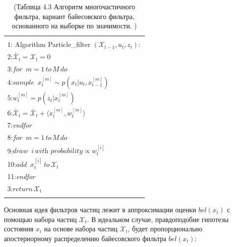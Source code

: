 \documentclass[10pt,a4paper]{article}
\begin{document}
\begin{table}[H]
\begin{center}
\begin{tabular}{|l|}
\hline
{}\\
1: \hspace{3mm} Algorithm Particle\_filter $(\mathcal X_{t-1},u_t,z_t):$ \\
2:\hspace{7mm}$\bar{\mathcal X}_t=\mathcal X_t=0$\\
3:\hspace{7mm}$\textit{for }\, m=1\, \textit{to}\, M\,\textit{do}$\\
4:\hspace{12mm}$\textit{sample }\,x_t^{[m]}\sim p(x_t|u_t,x_{t-1}^{[m]})$\\
5:\hspace{12mm}$w_t^{[m]}=p(z_t|x_t^{[m]})$\\
6:\hspace{12mm}$\bar{\mathcal X}_t=\bar{\mathcal X}_t+\langle x_t^{[m]},w_t^{[m]}\rangle$\\
7:\hspace{7mm}\textit{endfor}\\
8:\hspace{7mm}$\textit{for }\, m=1\, \textit{to}\, M\,\textit{do}$\\
9:\hspace{12mm}$\textit{draw } \,i\, \textit{with probability} \propto w_t^{[i]}$\\
10:\hspace{12mm}$\textit{add }\, x_t^{[i]}\, \textit{to}\, \mathcal X_t$\\
11:\hspace{7mm}\textit{endfor}\\
3:\hspace{7mm}$\textit{return}\, \mathcal X_t$\\
{}\\
\hline
\end{tabular}
\caption{(Таблица 4.3 Алгоритм многочастичного фильтра, вариант байесовского фильтра, основанного на выборке по значимости. )}
\end{center}
\end{table}
Основная идея фильтров частиц лежит в аппроксимации оценки $bel(x_t)$ с помощью набора частиц $\mathcal X_t$. В идеальном случае, правдоподобие гипотезы состояния $x_t$ на основе набора частиц $\mathcal X_t$, будет пропорционально апостериорному распределению байесовского фильтра 
$bel(x_t)$:\\
\end{document}
